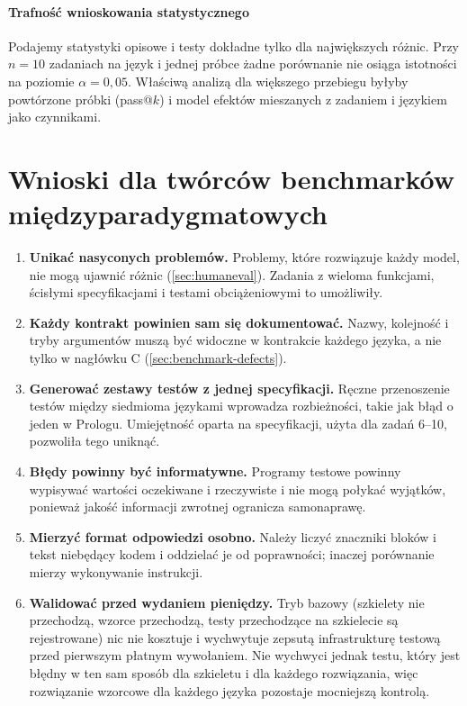 \paragraph{Trafność wnioskowania statystycznego} Podajemy statystyki opisowe i testy dokładne tylko
dla największych różnic. Przy $n = 10$ zadaniach na język i jednej próbce żadne porównanie nie
osiąga istotności na poziomie $\alpha = 0,05$. Właściwą analizą dla większego przebiegu byłyby
powtórzone próbki (pass@$k$) i model efektów mieszanych z zadaniem i językiem jako czynnikami.

\section{Wnioski dla twórców benchmarków międzyparadygmatowych}
\label{sec:lessons}

\begin{enumerate}
  \item \textbf{Unikać nasyconych problemów.} Problemy, które rozwiązuje każdy model, nie mogą
    ujawnić różnic (\cref{sec:humaneval}). Zadania z wieloma funkcjami, ścisłymi specyfikacjami
    i testami obciążeniowymi to umożliwiły.
  \item \textbf{Każdy kontrakt powinien sam się dokumentować.} Nazwy, kolejność i tryby argumentów
    muszą być widoczne w kontrakcie każdego języka, a nie tylko w nagłówku C
    (\cref{sec:benchmark-defects}).
  \item \textbf{Generować zestawy testów z jednej specyfikacji.} Ręczne przenoszenie testów między
    siedmioma językami wprowadza rozbieżności, takie jak błąd o jeden w Prologu. Umiejętność
    oparta na specyfikacji, użyta dla zadań 6--10, pozwoliła tego uniknąć.
  \item \textbf{Błędy powinny być informatywne.} Programy testowe powinny wypisywać wartości
    oczekiwane i rzeczywiste i nie mogą połykać wyjątków, ponieważ jakość informacji zwrotnej
    ogranicza samonaprawę.
  \item \textbf{Mierzyć format odpowiedzi osobno.} Należy liczyć znaczniki bloków i tekst
    niebędący kodem i oddzielać je od poprawności; inaczej porównanie mierzy wykonywanie
    instrukcji.
  \item \textbf{Walidować przed wydaniem pieniędzy.} Tryb bazowy (szkielety nie przechodzą,
    wzorce przechodzą, testy przechodzące na szkielecie są rejestrowane) nic nie kosztuje
    i wychwytuje zepsutą infrastrukturę testową przed pierwszym płatnym wywołaniem. Nie wychwyci
    jednak testu, który jest błędny w ten sam sposób dla szkieletu i dla każdego rozwiązania,
    więc rozwiązanie wzorcowe dla każdego języka pozostaje mocniejszą kontrolą.
\end{enumerate}

